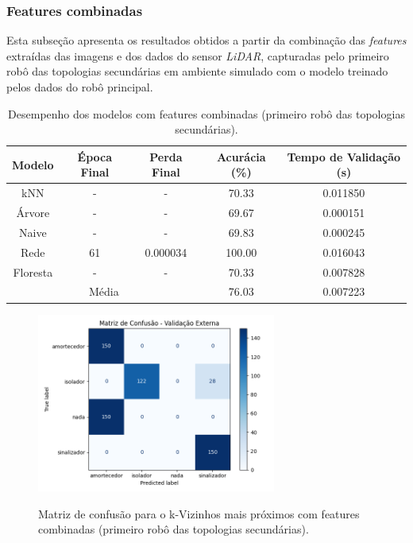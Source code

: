 \subsubsection{Features combinadas}

Esta subseção apresenta os resultados obtidos a partir da combinação das \textit{features}
extraídas das imagens e dos dados do sensor \textit{LiDAR}, capturadas pelo primeiro robô das topologias secundárias em ambiente simulado com o modelo treinado pelos dados do robô principal.

\begin{table}[H]
\caption{Desempenho dos modelos com features combinadas (primeiro robô das topologias secundárias).}
\centering
\begin{tabular}{ccccc}
\hline
\textbf{Modelo} & \textbf{Época Final} & \textbf{Perda Final} & \textbf{Acurácia (\%)} & \textbf{Tempo de Validação (s)}  \\
\hline
kNN      & - & - & 70.33 & 0.011850 \\
Árvore   & - & - & 69.67 & 0.000151 \\
Naive    & - & - & 69.83 & 0.000245 \\
Rede     & 61 & 0.000034 & 100.00 & 0.016043 \\
Floresta & - & - & 70.33 & 0.007828 \\
\hline
\multicolumn{3}{c}{Média} & 76.03 & 0.007223 \\
\hline
\end{tabular}
\fonte{}
\label{tab:modelos_feat_combinadas_robo1}
\end{table}

\begin{figure}[H]
\centering
\caption{Matriz de confusão para o k-Vizinhos mais próximos com features combinadas (primeiro robô das topologias secundárias).}
\includegraphics[width=0.7\textwidth]{figuras/Resultados/multi_primeiro_Teste5_knn.png}
\label{fig:mc_featcomb_knn_robo1_t5}
\fonte{}
\end{figure}

